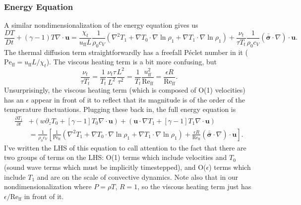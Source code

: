 \documentclass[aps, pre, onecolumn, nofootinbib, notitlepage, groupedaddress, amsfonts, amssymb, amsmath, longbibliography, superscriptaddress]{revtex4-1}
\newcommand{\grad}{\ensuremath{\nabla}}
\newcommand{\lilstressT}{\ensuremath{\bm{\bar{\bar{\sigma}}}}}
\begin{document}
\subsubsection{Energy Equation}
A similar nondimensionalization of the energy equation gives us
\begin{equation}
\frac{D T}{D t} + (\gamma-1)T \grad\cdot\bm{u} = 
\frac{\chi_t}{u_{\text{ff}} L}\frac{1}{\rho_0 c_V} (\grad^2 T_1 + \grad T_0\cdot\grad\ln\rho_1 + \grad T_1\cdot\grad\ln\rho_1)
+ \frac{\nu_t}{\tau T_t}\frac{1}{\rho_0 c_V} (\lilstressT\cdot\grad)\cdot\bm{u}.
\end{equation}
The thermal diffusion term straightforwardly has a freefall P\'{e}clet number in it ($\text{Pe}_{\text{ff}} = u_{\text{ff}} L / \chi_t$).
The viscous heating term is a bit more confusing, but
$$
\frac{\nu_t}{\tau T_t} = \frac{1}{T_t}\frac{\nu_t \tau}{L^2} \frac{L^2}{\tau^2} = \frac{1}{T_t}\frac{u_{\text{ff}}^2}{\text{Re}_{\text{ff}}} = \frac{\epsilon R}{\text{Re}_{\text{ff}}}.
$$
Unsurprisingly, the viscous heating term (which is composed of O(1) velocities) has an $\epsilon$ appear in front of it to reflect that its magnitude is of the order of the temperature fluctuations.
Plugging these back in, the full energy equation is
\begin{equation}
\begin{split}
\frac{\partial T_1}{\partial t} &+ (w \partial_z T_0 + [\gamma-1]T_0\grad\cdot\bm{u}) + (\bm{u}\cdot\grad T_1 + [\gamma-1] T_1\grad\cdot\bm{u})
\\
&= \frac{1}{\rho_0 c_V}\left[
\frac{1}{\text{Pe}_{\text{ff}}}(\grad^2 T_1 + \grad T_0 \cdot\grad\ln\rho_1 + \grad T_1 \cdot\grad\ln\rho_1)
+ \frac{\epsilon R}{\text{Re}_{\text{ff}}} (\lilstressT\cdot\grad)\cdot\bm{u}
\right].
\end{split}
\end{equation}
I've written the LHS of this equation to call attention to the fact that there are two groups of terms on the LHS: O(1) terms which include velocities and $T_0$ (sound wave terms which must be implicitly timestepped), and O($\epsilon$) terms which include $T_1$ and are on the scale of convective dynamics.
Note also that in our nondimensionalization where $P = \rho T$, $R = 1$, so the viscous heating term just has $\epsilon/\text{Re}_{\text{ff}}$ in front of it.
\end{document}
